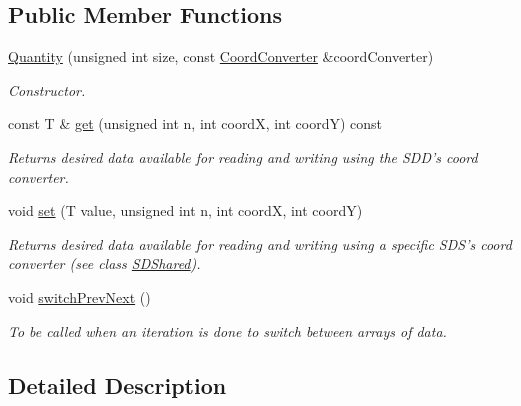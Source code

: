 \subsection*{Public Member Functions}
\begin{DoxyCompactItemize}
\item 
\hyperlink{classQuantity_ab07b278cfe453e82756684b1730efc95}{Quantity} (unsigned int size, const \hyperlink{classCoordConverter}{CoordConverter} \&coordConverter)
\begin{DoxyCompactList}\small\item\em Constructor. \item\end{DoxyCompactList}\item 
const T \& \hyperlink{classQuantity_a11f51450ca261ffa788f08fe29aecddf}{get} (unsigned int n, int coordX, int coordY) const 
\begin{DoxyCompactList}\small\item\em Returns desired data available for reading and writing using the SDD's coord converter. \item\end{DoxyCompactList}\item 
void \hyperlink{classQuantity_a10c68498d1dfe59535a6f07c0627c8d4}{set} (T value, unsigned int n, int coordX, int coordY)
\begin{DoxyCompactList}\small\item\em Returns desired data available for reading and writing using a specific SDS's coord converter (see class \hyperlink{classSDShared}{SDShared}). \item\end{DoxyCompactList}\item 
\hypertarget{classQuantity_af0799b7702ab9c7724399a6d76a41ea9}{
void \hyperlink{classQuantity_af0799b7702ab9c7724399a6d76a41ea9}{switchPrevNext} ()}
\label{classQuantity_af0799b7702ab9c7724399a6d76a41ea9}

\begin{DoxyCompactList}\small\item\em To be called when an iteration is done to switch between arrays of data. \item\end{DoxyCompactList}\end{DoxyCompactItemize}


\subsection{Detailed Description}
